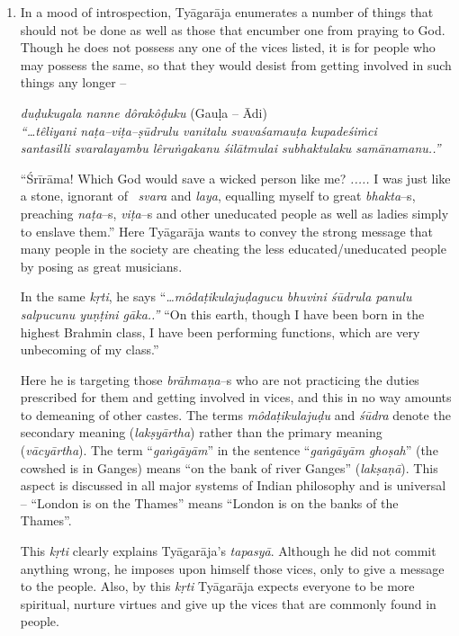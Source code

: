 \begin{enumerate}
 \item 
 In a mood of introspection, Tyāgarāja enumerates a number of things that should not be done as well as those that encumber one from praying to God. Though he does not possess any one of the vices listed, it is for people who may possess the same, so that they would desist from getting involved in such things any longer –  

\begin{myquote}
\textit{duḍukugala nanne dôrakôḍuku} (Gauḷa – Ādi)\\\textit{“…têliyani naṭa–viṭa–ṣūdrulu vanitalu svavaśamauṭa kupadeśiṁci}\\\textit{santasilli svaralayambu lêruṅgakanu śilātmulai subhaktulaku samānamanu..”}
\end{myquote}

 “Śrīrāma! Which God would save a wicked person like me? \textit{.....} I was just like a stone, ignorant of  \textit{svara} and \textit{laya}, equalling myself to great \textit{bhakta}–s, preaching \textit{naṭa}–s, \textit{viṭa}–s and other uneducated people as well as ladies simply to enslave them.” Here Tyāgarāja wants to convey the strong message that many people in the society are cheating the less educated/uneducated people by posing as great musicians.

 In the same \textit{kṛti}, he says “\textit{…môdaṭikulajuḍagucu bhuvini śūdrula panulu salpucunu yuṇṭini gāka..”} “On this earth, though I have been born in the highest Brahmin class, I have been performing functions, which are very unbecoming of my class.”

 Here he is targeting those \textit{brāhmaṇa}–s who are not practicing the duties prescribed for them and getting involved in vices, and this in no way amounts to demeaning of other castes. The terms \textit{môdaṭikulajuḍu} and \textit{śūdra} denote the secondary meaning (\textit{lakṣyārtha}) rather than the primary meaning (\textit{vācyārtha}). The term “\textit{gaṅgāyām}” in the sentence “\textit{gaṅgāyām ghoṣah}” (the cowshed is in Ganges) means “on the bank of river Ganges” (\textit{lakṣaṇā}). This aspect is discussed in all major systems of Indian philosophy and is universal – “London is on the Thames” means “London is on the banks of the Thames”.

 This \textit{kṛti} clearly explains Tyāgarāja’s \textit{tapasyā}. Although he did not commit anything wrong, he imposes upon himself those vices, only to give a message to the people. Also, by this \textit{kṛti} Tyāgarāja expects everyone to be more spiritual, nurture virtues and give up the vices that are commonly found in people.


\end{enumerate}
